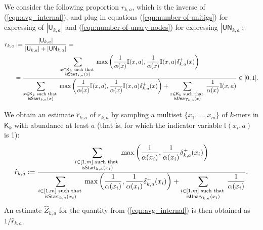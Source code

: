 \documentclass[a4paper,11pt]{article}
\newcommand{\U}{\mathsf{U}_{k,a}}
\newcommand{\UN}{\mathsf{UN}_{k,a}}
\newcommand{\dplus}{\delta^+_{k,a}}
\newcommand{\K}{\mathsf{K}}
\newcommand{\abu}{\alpha}
\newcommand{\isstart}{{\sf isStart}_{k,a}}
\newcommand{\isunary}{{\sf isUnary}_{k,a}}
\begin{document}
We consider the following proportion $r_{k,a}$, which is the inverse of (\ref{eqn:avg_internal}), and plug in equations (\ref{eqn:number-of-unitigs}) for expressing of $|\U|$ and (\ref{eqn:number-of-unary-nodes}) for expressing $|\UN|$:
\begin{align*}
r_{k,a} & := \frac{|\U|}{|\U| + |\UN|} = \\ 
& = \frac{\displaystyle\sum_{\begin{subarray}{c} x \in \K_k \text{ such that }\\ \isstart(x) \end{subarray}} \max\left(\frac{1}{\abu(x)}\mathbb{I}(x,a),\frac{1}{\abu(x)}\mathbb{I}(x,a)\dplus(x)\right)}{\displaystyle\sum_{\begin{subarray}{c} x \in \K_k \text{ such that }\\ \isstart(x) \end{subarray}} \max\left(\frac{1}{\abu(x)}\mathbb{I}(x,a),\frac{1}{\abu(x)}\mathbb{I}(x,a)\dplus(x)\right) + \sum_{\begin{subarray}{c} x \in \K_k \text{ such that } \\ \isunary(x)  \end{subarray}} \frac{1}{\abu(x)}\mathbb{I}(x,a)}\in [0,1].\\
\end{align*}

We obtain an estimate $\hat{r}_{k,a}$ of $r_{k,a}$ by sampling a multiset $\{x_1,\dots,x_m\}$ of $k$-mers in $\K_k$ with abundance at least $a$ (that is, for which the indicator variable $\mathbb{I}(x_i,a)$ is 1):
\[\hat{r}_{k,a} := \frac{\displaystyle\sum_{\begin{subarray}{c} i \in [1,m] \text{ such that } \\ \isstart(x_i) \end{subarray}} \max\left(\frac{1}{\abu(x_i)},\frac{1}{\abu(x_i)}\dplus(x_i)\right)}{\displaystyle \sum_{\begin{subarray}{c} i \in [1,m] \text{ such that } \\ \isstart(x_i) \end{subarray}} \max\left(\frac{1}{\abu(x_i)},\frac{1}{\abu(x_i)}\dplus(x_i)\right) + \sum_{\begin{subarray}{c} i \in [1,m] \text{ such that } \\ \isunary(x_i) \end{subarray}} \frac{1}{\abu(x_i)}}.\]
An estimate $\hat{Z}_{k,a}$ for the quantity from (\ref{eqn:avg_internal}) is then obtained as $1/\hat{r}_{k,a}$. 
\end{document}
